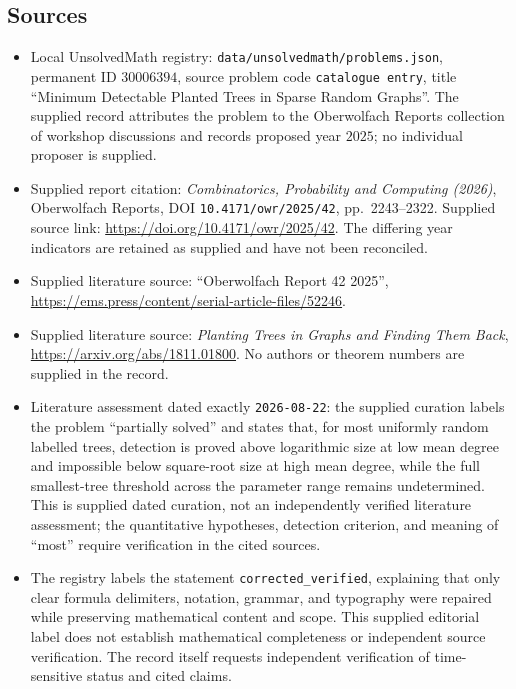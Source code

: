 \documentclass[11pt]{article}
\begin{document}
\subsection{Sources}
\begin{itemize}
\item Local UnsolvedMath registry: \texttt{data/unsolvedmath/problems.json}, permanent ID \(30006394\), source problem code \texttt{catalogue entry}, title ``Minimum Detectable Planted Trees in Sparse Random Graphs''. The supplied record attributes the problem to the Oberwolfach Reports collection of workshop discussions and records proposed year \(2025\); no individual proposer is supplied.
\item Supplied report citation: \emph{Combinatorics, Probability and Computing (2026)}, Oberwolfach Reports, DOI \texttt{10.4171/owr/2025/42}, pp.\ 2243--2322. Supplied source link: \url{https://doi.org/10.4171/owr/2025/42}. The differing year indicators are retained as supplied and have not been reconciled.
\item Supplied literature source: ``Oberwolfach Report 42 2025'', \url{https://ems.press/content/serial-article-files/52246}.
\item Supplied literature source: \emph{Planting Trees in Graphs and Finding Them Back}, \url{https://arxiv.org/abs/1811.01800}. No authors or theorem numbers are supplied in the record.
\item Literature assessment dated exactly \texttt{2026-08-22}: the supplied curation labels the problem ``partially solved'' and states that, for most uniformly random labelled trees, detection is proved above logarithmic size at low mean degree and impossible below square-root size at high mean degree, while the full smallest-tree threshold across the parameter range remains undetermined. This is supplied dated curation, not an independently verified literature assessment; the quantitative hypotheses, detection criterion, and meaning of ``most'' require verification in the cited sources.
\item The registry labels the statement \texttt{corrected\_verified}, explaining that only clear formula delimiters, notation, grammar, and typography were repaired while preserving mathematical content and scope. This supplied editorial label does not establish mathematical completeness or independent source verification. The record itself requests independent verification of time-sensitive status and cited claims.
\end{itemize}
\end{document}
